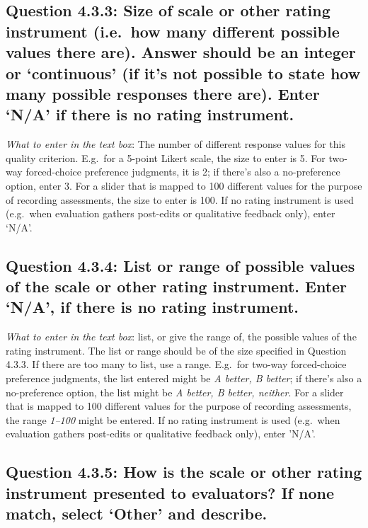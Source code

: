 \documentclass[11pt,a4paper]{article}
\begin{document}
\subsection*{Question 4.3.3:  Size of scale or other rating instrument (i.e.\ how many different possible values there are). Answer should be an integer or `continuous' (if it's not possible to state how many possible responses there are). Enter `N/A' if there is no rating instrument.}

\noindent\textit{What to enter in the text box}: The number of different response values for this quality criterion. E.g.\ for a 5-point Likert scale, the size to enter is 5. For two-way forced-choice preference judgments, it is 2; if there's also a no-preference option, enter 3. For a slider that is mapped to 100 different values for the purpose of recording assessments, the size to enter is 100. If no rating instrument is used (e.g.\ when evaluation gathers post-edits or qualitative feedback only), enter `N/A'.

\subsection*{Question 4.3.4: List or range of possible values of the scale or other rating instrument. Enter `N/A', if there is no rating instrument.} 

\noindent\textit{What to enter in the text box}: list, or give the range of, the possible values  of the rating instrument. The list or range should be of the size specified in Question 4.3.3. If there are too many to list, use a range. E.g.\ for two-way forced-choice preference judgments, the list entered might be \textit{A better, B better}; if there's also a no-preference option, the list 
might be \textit{A better, B better, neither}. For a slider that is mapped to 100 different values for the purpose of recording assessments, the range \textit{1--100} might be entered. If no rating instrument is used (e.g.\ when evaluation gathers post-edits or qualitative feedback only), enter 'N/A'.

\subsection*{Question 4.3.5:  How is the scale or other rating instrument presented to evaluators? If none match, select `Other’ and describe.}
\end{document}
